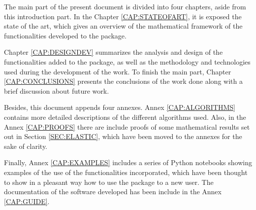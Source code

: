 The main part of the present document is divided into four chapters, aside from 
this introduction part. In the Chapter \ref{CAP:STATEOFART}, it is exposed the
state of the art, which gives an overview of the mathematical framework of the
functionalities developed to the package.

Chapter \ref{CAP:DESIGNDEV} summarizes the analysis and design of the
functionalities added to the package, as well as the methodology and
technologies used during the development of the work. To finish the main part,
Chapter \ref{CAP:CONCLUSIONS} presents the conclusions of the work done along
with a brief discussion about future work.

Besides, this document appends four annexes. Annex \ref{CAP:ALGORITHMS} contains
more detailed descriptions of the different algorithms used. Also, in the Annex
\ref{CAP:PROOFS} there are include proofs of some mathematical results set out
in Section \ref{SEC:ELASTIC}, which have been moved to the annexes for the
sake of clarity.

Finally, Annex \ref{CAP:EXAMPLES} includes a series of Python notebooks showing
examples of the use of the functionalities incorporated, which have been thought
to show in a pleasant way how to use the package to a new user. The
documentation of the software developed has been include in the
Annex \ref{CAP:GUIDE}.

